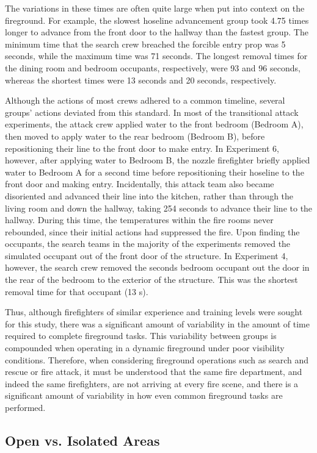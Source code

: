 \documentclass[12pt,oneside]{article}
\begin{document}
The variations in these times are often quite large when put into context on the fireground. For example, the slowest hoseline advancement group took 4.75 times longer to advance from the front door to the hallway than the fastest group. The minimum time that the search crew breached the forcible entry prop was 5 seconds, while the maximum time was 71 seconds. The longest removal times for the dining room and bedroom occupants, respectively, were 93 and 96 seconds, whereas the shortest times were 13 seconds and 20 seconds, respectively. 

Although the actions of most crews adhered to a common timeline, several groups' actions deviated from this standard. In most of the transitional attack experiments, the attack crew applied water to the front bedroom (Bedroom A), then moved to apply water to the rear bedroom (Bedroom B), before repositioning their line to the front door to make entry. In Experiment 6, however, after applying water to Bedroom B, the nozzle firefighter briefly applied water to Bedroom A for a second time before repositioning their hoseline to the front door and making entry. Incidentally, this attack team also became disoriented and advanced their line into the kitchen, rather than through the living room and down the hallway, taking 254 seconds to advance their line to the hallway. During this time, the temperatures within the fire rooms never rebounded, since their initial actions had suppressed the fire. Upon finding the occupants, the search teams in the majority of the experiments removed the simulated occupant out of the front door of the structure. In Experiment 4, however, the search crew removed the seconds bedroom occupant out the door in the rear of the bedroom to the exterior of the structure. This was the shortest removal time for that occupant (13 s). 

Thus, although firefighters of similar experience and training levels were sought for this study, there was a significant amount of variability in the amount of time required to complete fireground tasks. This variability between groups is compounded when operating in a dynamic fireground under poor visibility conditions. Therefore, when considering fireground operations such as search and rescue or fire attack, it must be understood that the same fire department, and indeed the same firefighters, are not arriving at every fire scene, and there is a significant amount of variability in how even common fireground tasks are performed. 

\subsection{Open vs. Isolated Areas}
\label{subsec:open_v_iso}
\end{document}
